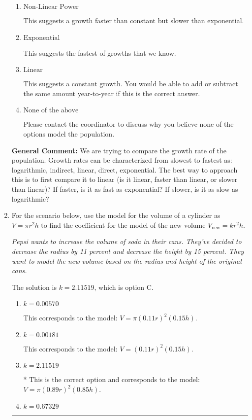 \documentclass{extbook}[14pt]
\newcommand{\litem}[1]{\item #1

\rule{\textwidth}{0.4pt}}
\begin{document}
\begin{enumerate}
{\begin{enumerate}[label=\Alph*.]
This suggests the slowest of growths that we know.
\item \( \text{Non-Linear Power} \)

This suggests a growth faster than constant but slower than exponential.
\item \( \text{Exponential} \)

This suggests the fastest of growths that we know.
\item \( \text{Linear} \)

This suggests a constant growth. You would be able to add or subtract the same amount year-to-year if this is the correct answer.
\item \( \text{None of the above} \)

Please contact the coordinator to discuss why you believe none of the options model the population.
\end{enumerate}

\textbf{General Comment:} We are trying to compare the growth rate of the population. Growth rates can be characterized from slowest to fastest as: logarithmic, indirect, linear, direct, exponential. The best way to approach this is to first compare it to linear (is it linear, faster than linear, or slower than linear)? If faster, is it as fast as exponential? If slower, is it as slow as logarithmic?
}
\litem{
For the scenario below, use the model for the volume of a cylinder as $V = \pi r^2 h$ to find the coefficient for the model of the new volume $V_{\text{new}} = k r^2 h$.

\begin{center}
    \textit{ Pepsi wants to increase the volume of soda in their cans. They've decided to decrease the radius by 11 percent and decrease the height by 15 percent. They want to model the new volume based on the radius and height of the original cans. }
\end{center}
The solution is \( k = 2.11519 \), which is option C.\begin{enumerate}[label=\Alph*.]
\item \( k = 0.00570 \)

This corresponds to the model: $V = \pi (0.11 r)^2 (0.15 h)$.
\item \( k = 0.00181 \)

This corresponds to the model: $V = (0.11 r)^2 (0.15 h)$.
\item \( k = 2.11519 \)

* This is the correct option and corresponds to the model: $V = \pi (0.89 r)^2 (0.85 h)$.
\item \( k = 0.67329 \)


\end{enumerate}}
\end{enumerate}
\end{document}
